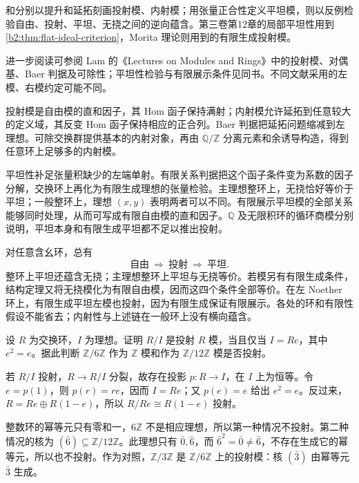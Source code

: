 \ProseParagraphBreak
{}和分别以提升和延拓刻画投射模、内射模；用张量正合性定义平坦模，则以反例检验自由、投射、平坦、无挠之间的逆向蕴含。第三卷第12章的局部平坦性用到\cref{b2:thm:flat-ideal-criterion}，Morita 理论则用到的有限生成投射模。

\ProseParagraphBreak
进一步阅读可参阅 Lam 的《Lectures on Modules and Rings》\cite[\S\S 2A--2B, 3A, 3C]{Lam1999ModulesRings}中的投射模、对偶基、Baer 判据及可除性；平坦性检验与有限展示条件见同书\cite[\S\S 4A, 4C--4E]{Lam1999ModulesRings}。不同文献采用的左模、右模约定可能不同。






\begin{chaptersummary}
	投射模是自由模的直和因子，其 Hom 函子保持满射；内射模允许延拓到任意较大的定义域，其反变 Hom 函子保持相应的正合列。Baer 判据把延拓问题缩减到左理想。可除交换群提供基本的内射对象，再由 \(\mathbb Q/\mathbb Z\) 分离元素和余诱导构造，得到任意环上足够多的内射模。

	\ProseParagraphBreak
	平坦性补足张量积缺少的左端单射。有限关系判据把这个函子条件变为系数的因子分解，交换环上再化为有限生成理想的张量检验。主理想整环上，无挠恰好等价于平坦；一般整环上，理想 \((x,y)\) 表明两者可以不同。有限展示平坦模的全部关系能够同时处理，从而可写成有限自由模的直和因子。\(\mathbb Q\) 及无限积环的循环商模分别说明，平坦本身和有限生成平坦都不足以推出投射。

	\ProseParagraphBreak
	对任意含幺环，总有
	\[
		\text{自由}\ \Longrightarrow\ \text{投射}\ \Longrightarrow\ \text{平坦}.
	\]
	整环上平坦还蕴含无挠；主理想整环上平坦与无挠等价。若模另有有限生成条件，结构定理又将无挠模化为有限自由模，因而这四个条件全部等价。在左 Noether 环上，有限生成平坦左模也投射，因为有限生成保证有限展示。各处的环和有限性假设不能省去；内射性与上述链在一般环上没有横向蕴含。
\end{chaptersummary}

\BookExercises

\begin{exercise}\label{b2:ex:07-projective-quotient-idempotent}
	设 \(R\) 为交换环，\(I\) 为理想。证明 \(R/I\) 是投射 \(R\) 模，当且仅当 \(I=Re\)，其中 \(e^2=e\)。据此判断 \(\mathbb Z/6\mathbb Z\) 作为 \(\mathbb Z\) 模和作为 \(\mathbb Z/12\mathbb Z\) 模是否投射。
\end{exercise}
\begin{solution}
	若 \(R/I\) 投射，\(R\to R/I\) 分裂，故存在投影 \(p:R\to I\)，在 \(I\) 上为恒等。令 \(e=p(1)\)，则 \(p(r)=re\)，因而 \(I=Re\)；又 \(p(e)=e\) 给出 \(e^2=e\)。反过来，\(R=Re\oplus R(1-e)\)，所以 \(R/Re\cong R(1-e)\) 投射。

	整数环的幂等元只有零和一，\(6\mathbb Z\) 不是相应理想，所以第一种情况不投射。第二种情况的核为 \((\bar6)\subseteq\mathbb Z/12\mathbb Z\)。此理想只有 \(\bar0,\bar6\)，而 \(\bar6^2=\bar0\ne\bar6\)，不存在生成它的幂等元，所以也不投射。作为对照，\(\mathbb Z/3\mathbb Z\) 是 \(\mathbb Z/6\mathbb Z\) 上的投射模：核 \((\bar3)\) 由幂等元 \(\bar3\) 生成。
\end{solution}

